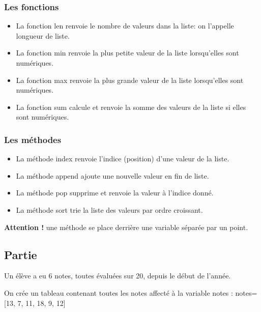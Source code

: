 \documentclass[12pt,a4paper]{article}
\newcounter{numexo}
\begin{document}
\subsubsection*{Les fonctions}
\begin{itemize}
\item La fonction \textsf{len} renvoie le nombre de valeurs dans la liste: on l'appelle longueur de liste.
\item La fonction \textsf{min} renvoie la plus petite valeur de la liste lorsqu'elles sont numériques.
\item La fonction \textsf{max} renvoie la plus grande valeur de la liste lorsqu'elles sont numériques.
\item La fonction \textsf{sum} calcule et renvoie la somme des valeurs de la liste si elles sont numériques.
\end{itemize}


\subsubsection*{Les méthodes}
\begin{itemize}
\item La méthode \textsf{index} renvoie l'indice (position) d'une valeur de la liste.
\item La méthode \textsf{append} ajoute une nouvelle valeur en fin de liste.
\item La méthode \textsf{pop} supprime et renvoie la valeur à l'indice donné.
\item La méthode \textsf{sort} trie la liste des valeurs par ordre croissant.
\end{itemize}

\textbf{Attention !} une méthode se place derrière une variable séparée par un point.\medskip


\newpage
\addtocounter{numexo}{1}
\subsection*{\Large Partie \thenumexo}

Un élève a eu 6 notes, toutes évaluées sur 20, depuis le début de l'année. 

On crée un tableau contenant toutes les notes affecté à la variable \textsf{notes}
: \textsf{notes=[13, 7, 11, 18, 9, 12]}
\end{document}
